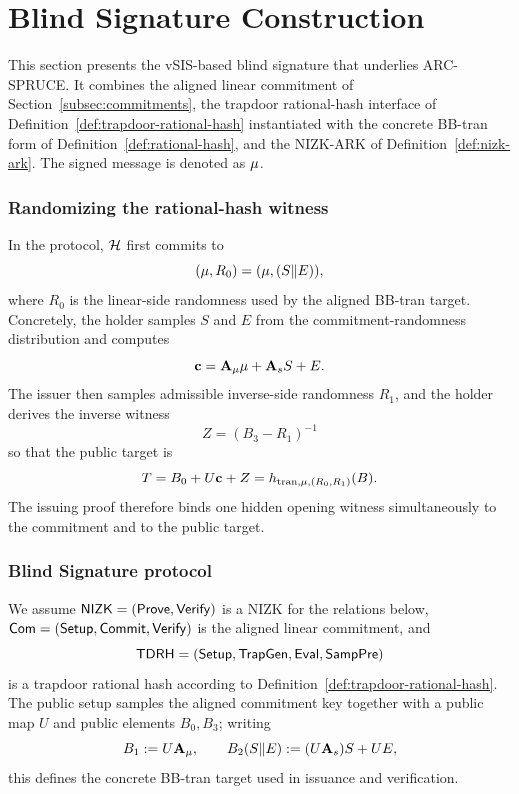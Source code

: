 \section{Blind Signature Construction}
\label{sec:blind-signature}

This section presents the vSIS-based blind signature that underlies ARC-SPRUCE. It combines the aligned
linear commitment of Section~\ref{subsec:commitments}, the trapdoor rational-hash interface of
Definition~\ref{def:trapdoor-rational-hash} instantiated with the concrete BB-tran form of
Definition~\ref{def:rational-hash}, and the NIZK-ARK of Definition~\ref{def:nizk-ark}. The signed message is denoted as
\(\mathbf{\mu}\).

\subsubsection{Randomizing the rational-hash witness}
In the protocol, \(\mathcal{H}\) first commits to
\[
(\mathbf{\mu},R_0)=(\mathbf{\mu},(S\Vert E)),
\]
where \(R_0\) is the linear-side randomness used by the aligned BB-tran target. Concretely, the holder
samples \(S\) and \(E\) from the commitment-randomness distribution and computes
\[
\mathbf{c}=\mathbf{A}_\mu\mathbf{\mu}+\mathbf{A}_s S + E.
\]
The issuer then samples admissible inverse-side randomness \(R_1\), and the holder derives the inverse
witness
\[
Z=(B_3-R_1)^{-1}
\]
so that the public target is
\[
T = B_0 + U\mathbf{c} + Z = h_{\mathrm{tran},\mathbf{\mu},(R_0,R_1)}(B).
\]
The issuing proof therefore binds one hidden opening witness simultaneously to the commitment and to the
public target.

\subsubsection{Blind Signature protocol}
\label{subsec:bs-protocol}
We assume \(\mathsf{NIZK}=(\mathsf{Prove},\mathsf{Verify})\) is a NIZK for the relations below,
\(\mathsf{Com}=(\mathsf{Setup},\mathsf{Commit},\mathsf{Verify})\) is the aligned linear commitment, and
\[
  \mathsf{TDRH}=(\mathsf{Setup},\mathsf{TrapGen},\mathsf{Eval},\mathsf{SampPre})
\]
is a trapdoor rational hash according to Definition~\ref{def:trapdoor-rational-hash}. The public setup
samples the aligned commitment key together with a public map \(U\) and public elements \(B_0,B_3\); writing
\[
B_1:=U\mathbf{A}_\mu,
\qquad
B_2(S\Vert E):=(U\mathbf{A}_s)S + UE,
\]
this defines the concrete BB-tran target used in issuance and verification.

